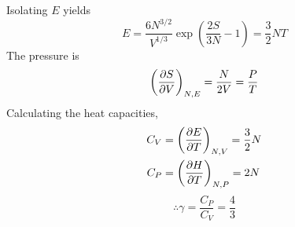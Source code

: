 \documentclass{article}
\begin{document}
\begin{sol}[1.7]
\begin{equation}
    \end{equation}
    Isolating $E$ yields
    \begin{equation}
        E=\frac{6N^{3/2}}{V^{1/3}}\exp\left(\frac{2S}{3N}-1\right)=\frac{3}{2}NT
    \end{equation}
    The pressure is 
    \begin{equation}
        \left(\partialderivative{S}{V}\right)_{N,E}=\frac{N}{2V}=\frac{P}{T}
    \end{equation}
    Calculating the heat capacities,
    \begin{align}
        C_V&=\left(\partialderivative{E}{T}\right)_{N,V}=\frac{3}{2}N\\
        C_P&=\left(\partialderivative{H}{T}\right)_{N,P}=2N
    \end{align}
    \begin{equation}
        \therefore \gamma=\frac{C_P}{C_V}=\frac{4}{3}
    \end{equation}
\end{sol}
\end{document}
